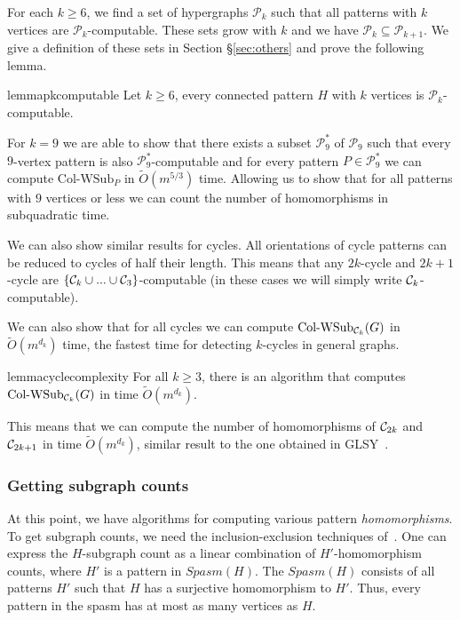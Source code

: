 \documentclass[a4paper,UKenglish,cleveref, autoref, numberwithinsect, thm-restate]{lipics-v2021}
\newcommand{\computable}[1]{${#1}$-computable}
\newcommand{\cycle}[1]{\cC_{#1}}
\newcommand{\WSub}[2]{\mathrm{\text{Col-WSub}}_{#2}(#1)}
\newcommand{\WSubNI}[1]{\mathrm{\text{Col-WSub}}_{#1}}
\newcommand{\Spasm}{Spasm}
\newcommand{\cC}{{\cal C}}
\newcommand{\cP}{\mathcal{P}}
\newcommand{\Sec}[1]{\S \ref{sec:#1}} \newcommand{\Eqn}[1]{\hyperref[eq:#1]{(\ref*{eq:#1})}} \newcommand{\Fig}[1]{{Fig.\,\ref{fig:#1}}} \newcommand{\Tab}[1]{\hyperref[tab:#1]{Tab.\,\ref*{tab:#1}}} \newcommand{\Table}[1]{\hyperref[tab:#1]{Table\,\ref*{tab:#1}}} \newcommand{\Thm}[1]{\hyperref[thm:#1]{Theorem\,\ref*{thm:#1}}} \newcommand{\Fact}[1]{\hyperref[fact:#1]{Fact\,\ref*{fact:#1}}} \newcommand{\Lem}[1]{\hyperref[lem:#1]{Lemma\,\ref*{lem:#1}}} \newcommand{\Prop}[1]{\hyperref[prop:#1]{Prop.~\ref*{prop:#1}}} \newcommand{\Cor}[1]{\hyperref[cor:#1]{Corollary~\ref*{cor:#1}}} \newcommand{\Conj}[1]{\hyperref[conj:#1]{Conjecture~\ref*{conj:#1}}} \newcommand{\Def}[1]{\hyperref[def:#1]{Definition~\ref*{def:#1}}} \newcommand{\Alg}[1]{\hyperref[alg:#1]{Alg.~\ref*{alg:#1}}} \newcommand{\Clm}[1]{\hyperref[clm:#1]{Claim~\ref*{clm:#1}}} \newcommand{\Obs}[1]{\hyperref[obs:#1]{Observation~\ref*{obs:#1}}} \newcommand{\Rem}[1]{\hyperref[rem:#1]{Remark~\ref*{rem:#1}}} \newcommand{\Con}[1]{\hyperref[con:#1]{Construction~\ref*{con:#1}}} \newcommand{\Step}[1]{\hyperref[step:#1]{Step~\ref*{step:#1}}} \newcommand{\Assumption}[1]{\hyperref[assm:#1]{Assumption\,\ref*{assm:#1}}}
\begin{document}
	For each $k\geq 6$, we find a set of hypergraphs $\cP_k$ such that all patterns with $k$ vertices are \computable{\cP_k}. These sets grow with $k$ and we have $\cP_k \subseteq \cP_{k+1}$. We give a definition of these sets in Section \Sec{others} and prove the following lemma.
	
	\begin{restatable}{lemma}{pkcomputable} \label{lem:pk_computable}
		Let $k\geq 6$, every connected pattern $H$ with $k$ vertices is \computable{\mathcal{P}_{k}}.
	\end{restatable}
	

	For $k=9$ we are able to show that there exists a subset $\cP^*_9$ of $\cP_9$ such that every $9$-vertex pattern is also \computable{\cP^*_9} and for every pattern $P \in \cP^*_9$ we can compute $\WSubNI{P}$ in $\tilde{O}(m^{5/3})$ time. Allowing us to show that for all patterns with $9$ vertices or less we can count the number of homomorphisms in subquadratic time.

	We can also show similar results for cycles. All orientations of cycle patterns can be reduced to cycles of half their length. This means that any $2k$-cycle and $2k+1$-cycle are \computable{\{\cycle{k}\cup...\cup \cycle{3} \}} (in these cases we will simply write \computable{\cycle{k}}).

	We can also show that for all cycles we can compute $\WSub{G}{\cycle{k}}$ in $\tilde{O}(m^{d_k})$ time, the fastest time for detecting $k$-cycles in general graphs.
	
	\begin{restatable}{lemma}{cyclecomplexity} \label{lem:cycle_complexity}
		For all $k\geq 3$, there is an algorithm that computes $\WSub{G}{\cycle{k}}$ in time $\tilde{O}(m^{d_k})$.
	\end{restatable}
	
	This means that we can compute the number of homomorphisms of $\cycle{2k}$ and $\cycle{2k+1}$ in time $\tilde{O}(m^{d_k})$, similar result to the one obtained in  GLSY~\cite{GiLeSh+23}.
	
	
	\subsubsection{Getting subgraph counts} \label{sec:subgraph}
	
	At this point, we have algorithms for computing various pattern \emph{homomorphisms}. To get subgraph counts,
	we need the inclusion-exclusion techniques of~\cite{CuDeMa17}. One can express the $H$-subgraph
	count as a linear combination of $H'$-homomorphism counts, where $H'$ is a pattern in $\Spasm(H)$.
	The $\Spasm(H)$ consists of all patterns $H'$ such that $H$ has a surjective homomorphism to $H'$.
	Thus, every pattern in the spasm has at most as many vertices as $H$. 
\end{document}
